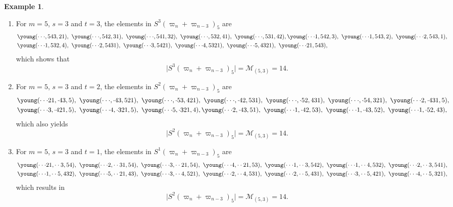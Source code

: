 \documentclass[11pt, leqno]{amsart}
\theoremstyle{plain}
\theoremstyle{definition}
\newtheorem{example}[theorem]{Example}
\numberwithin{equation}{section}
\newcommand{\fw}{\varpi} %
\newcommand{\Mot}{\mathcal{M}} %
\begin{document}
\begin{example}
\mbox{}
\begin{enumerate}
\item For $m=5$, $s=3$ and $t=3$, the elements in $S^3(\fw_n+\fw_{n-3})_5$ are
\begin{align*}
&\young(\cdot\cdot\cdot,543,21), \ \young(\cdot\cdot\cdot,542,31), \ \young(\cdot\cdot\cdot,541,32), \ \young(\cdot\cdot\cdot,532,41), \ \young(\cdot\cdot\cdot,531,42),  \young(\cdot\cdot\cdot1,542,3), \ \young(\cdot\cdot\cdot1,543,2), \  \young(\cdot\cdot\cdot2,543,1), \ \\
&\young(\cdot\cdot\cdot1,532,4), \ \young(\cdot\cdot\cdot2,5431), \  \young(\cdot\cdot\cdot3,5421), \  \young(\cdot\cdot\cdot4,5321), \  \young(\cdot\cdot\cdot5,4321), \   \young(\cdot\cdot\cdot21,543),
\end{align*}
which shows that
\[
\lvert S^3(\fw_n+\fw_{n-3})_5 \rvert = \Mot_{(5,3)}=14.
\]
\item For $m=5$, $s=3$ and $t=2$, the elements in $S^2(\fw_n+\fw_{n-3})_5$ are
\begin{align*}
&\young(\cdot\cdot\cdot21,\cdot43,5), \  \young(\cdot\cdot\cdot,\cdot43,521), \ \young(\cdot\cdot\cdot,\cdot53,421), \ \young(\cdot\cdot\cdot,\cdot42,531), \ \young(\cdot\cdot\cdot,\cdot52,431), \ \young(\cdot\cdot\cdot,\cdot54,321), \ \young(\cdot\cdot\cdot2,\cdot431,5), \\
 & \young(\cdot\cdot\cdot3,\cdot421,5), \  \young(\cdot\cdot\cdot4,\cdot321,5), \ \young(\cdot\cdot\cdot5,\cdot321,4), \young(\cdot\cdot\cdot2,\cdot43,51), \ \young(\cdot\cdot\cdot1,\cdot42,53), \ \young(\cdot\cdot\cdot1,\cdot43,52),  \ \young(\cdot\cdot\cdot1,\cdot52,43),
\end{align*}
which also yields
\[
\lvert S^2(\fw_n+\fw_{n-3})_5 \rvert = \Mot_{(5,3)} = 14.
\]
\item For $m=5$, $s=3$ and $t=1$, the elements in $S^1(\fw_n+\fw_{n-3})_5$ are
\begin{align*}
&\young(\cdot\cdot\cdot21,\cdot\cdot3,54), \ \young(\cdot\cdot\cdot2,\cdot\cdot31,54), \ \young(\cdot\cdot\cdot3,\cdot\cdot21,54), \ \young(\cdot\cdot\cdot4,\cdot\cdot21,53), \
\young(\cdot\cdot\cdot1,\cdot\cdot3,542), \ \young(\cdot\cdot\cdot1,\cdot\cdot4,532), \ \young(\cdot\cdot\cdot2,\cdot\cdot3,541), \\
&  \young(\cdot\cdot\cdot1,\cdot\cdot5,432), \ \young(\cdot\cdot\cdot5,\cdot\cdot21,43), \ \young(\cdot\cdot\cdot3,\cdot\cdot4,521), \ \young(\cdot\cdot\cdot2,\cdot\cdot4,531), \
\young(\cdot\cdot\cdot2,\cdot\cdot5,431), \ \young(\cdot\cdot\cdot3,\cdot\cdot5,421), \ \young(\cdot\cdot\cdot4,\cdot\cdot5,321), \
\end{align*}
which results in
\[
\lvert S^2(\fw_n+\fw_{n-3})_5 \rvert = \Mot_{(5,3)} = 14.
\]
\end{enumerate}
\end{example}
\end{document}

